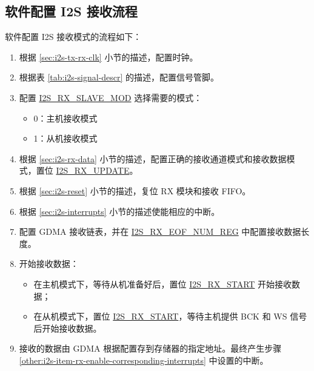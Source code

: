 \documentclass[main\_\_CN.tex]{subfiles}
\begin{document}
\subsection{软件配置 I2S 接收流程}\label{sec:i2s-configure-i2s-rx-mode}

软件配置 I2S 接收模式的流程如下：

\begin{enumerate}
    \item 根据 \ref{sec:i2s-tx-rx-clk} 小节的描述，配置时钟。
    \item 根据表 \ref{tab:i2s-signal-descr} 的描述，配置信号管脚。
    \item 配置 \hyperref[fielddesc:I2SRXSLAVEMOD]{I2S\_RX\_SLAVE\_MOD} 选择需要的模式：
    \begin{itemize}
        \item 0：主机接收模式
        \item 1：从机接收模式
    \end{itemize}
    \item 根据 \ref{sec:i2s-rx-data} 小节的描述，配置正确的接收通道模式和接收数据模式，置位 \hyperref[fielddesc:I2SRXUPDATE]{I2S\_RX\_UPDATE}。
    \item 根据 \ref{sec:i2s-reset} 小节的描述，复位 RX 模块和接收 FIFO。
    \item 根据 \ref{sec:i2s-interrupts} 小节的描述使能相应的中断。\label{other:i2s-item-rx-enable-corresponding-interrupts}
    \item 配置 GDMA 接收链表，并在 \hyperref[regdesc:I2SRXEOFNUMREG]{I2S\_RX\_EOF\_NUM\_REG} 中配置接收数据长度。
    \item 开始接收数据：
    \begin{itemize}
        \item 在主机模式下，等待从机准备好后，置位 \hyperref[fielddesc:I2SRXSTART]{I2S\_RX\_START} 开始接收数据；
        \item 在从机模式下，置位 \hyperref[fielddesc:I2SRXSTART]{I2S\_RX\_START}，等待主机提供 BCK 和 WS 信号后开始接收数据。
    \end{itemize}
    \item 接收的数据由 GDMA 根据配置存到存储器的指定地址。最终产生步骤 \ref{other:i2s-item-rx-enable-corresponding-interrupts} 中设置的中断。
\end{enumerate}



\end{document}
